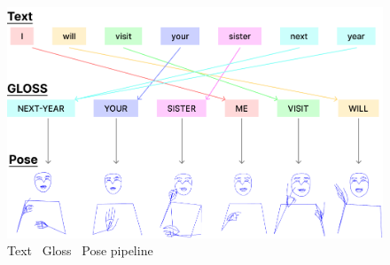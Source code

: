 \documentclass[../paper.tex]{subfiles}
\begin{document}
\begin{figure}[!htbp]
  \centerline{\includegraphics[width=\linewidth]{../figures/production-method.png}}
  \caption{Text \textrightarrow\ Gloss \textrightarrow\ Pose pipeline}\label{fig:production_method}
\end{figure}
\end{document}
